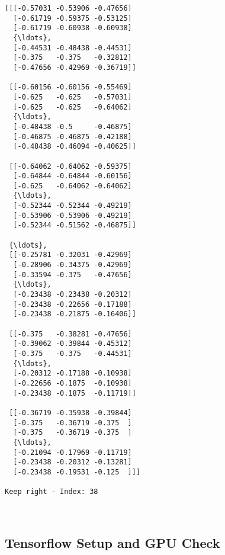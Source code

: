 \documentclass[11pt]{article}
\begin{document}
    \begin{Verbatim}[commandchars=\\\{\}]
[[[-0.57031 -0.53906 -0.47656]
  [-0.61719 -0.59375 -0.53125]
  [-0.61719 -0.60938 -0.60938]
  {\ldots}, 
  [-0.44531 -0.48438 -0.44531]
  [-0.375   -0.375   -0.32812]
  [-0.47656 -0.42969 -0.36719]]

 [[-0.60156 -0.60156 -0.55469]
  [-0.625   -0.625   -0.57031]
  [-0.625   -0.625   -0.64062]
  {\ldots}, 
  [-0.48438 -0.5     -0.46875]
  [-0.46875 -0.46875 -0.42188]
  [-0.48438 -0.46094 -0.40625]]

 [[-0.64062 -0.64062 -0.59375]
  [-0.64844 -0.64844 -0.60156]
  [-0.625   -0.64062 -0.64062]
  {\ldots}, 
  [-0.52344 -0.52344 -0.49219]
  [-0.53906 -0.53906 -0.49219]
  [-0.52344 -0.51562 -0.46875]]

 {\ldots}, 
 [[-0.25781 -0.32031 -0.42969]
  [-0.28906 -0.34375 -0.42969]
  [-0.33594 -0.375   -0.47656]
  {\ldots}, 
  [-0.23438 -0.23438 -0.20312]
  [-0.23438 -0.22656 -0.17188]
  [-0.23438 -0.21875 -0.16406]]

 [[-0.375   -0.38281 -0.47656]
  [-0.39062 -0.39844 -0.45312]
  [-0.375   -0.375   -0.44531]
  {\ldots}, 
  [-0.20312 -0.17188 -0.10938]
  [-0.22656 -0.1875  -0.10938]
  [-0.23438 -0.1875  -0.11719]]

 [[-0.36719 -0.35938 -0.39844]
  [-0.375   -0.36719 -0.375  ]
  [-0.375   -0.36719 -0.375  ]
  {\ldots}, 
  [-0.21094 -0.17969 -0.11719]
  [-0.23438 -0.20312 -0.13281]
  [-0.23438 -0.19531 -0.125  ]]] 

Keep right - Index: 38

    \end{Verbatim}

    \begin{center}
    \end{center}
    { \hspace*{\fill} \\}
    
    \hypertarget{tensorflow-setup-and-gpu-check}{%
\subsection{Tensorflow Setup and GPU
Check}\label{tensorflow-setup-and-gpu-check}}
\end{document}
